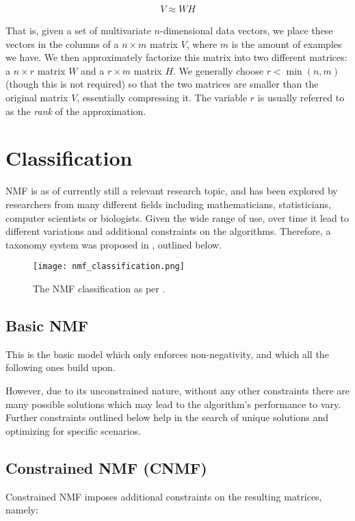 \begin{align}
V \approx WH
\end{align}

That is, given a set of multivariate $n$-dimensional data vectors, we place these vectors in the columns of a $n \times m$ matrix $V$, where $m$ is the amount of examples we have. We then approximately factorize this matrix into two different matrices: a $n \times r$ matrix $W$ and a $r \times m$ matrix $H$. We generally choose $r < \min(n,m)$ (though this is not required) so that the two matrices are smaller than the original matrix $V$, essentially compressing it. \cite{nmf_algorithms} The variable $r$ is usually referred to as the \emph{rank} of the approximation.

\section{Classification}
NMF is as of currently still a relevant research topic, and has been explored by researchers from many different fields including mathematicians, statisticians, computer scientists or biologists. Given the wide range of use, over time it lead to different variations and additional constraints on the algorithms. Therefore, a taxonomy system was proposed in \cite{wang_zhang_2013}, outlined below.

\begin{figure}[ht]
	\caption[NMF classification]{The NMF classification as per \cite{wang_zhang_2013}.}
	\centering
	\texttt{[image: nmf\_classification.png]}
\end{figure}

\subsection{Basic NMF}
This is the basic model which only enforces non-negativity, and which all the following ones build upon.

However, due to its unconstrained nature, without any other constraints there are many possible solutions  which may lead to the algorithm's performance to vary. Further constraints outlined below help in the search of unique solutions and optimizing for specific scenarios.

\subsection{Constrained NMF (CNMF)}
Constrained NMF imposes additional constraints on the resulting matrices, namely:

